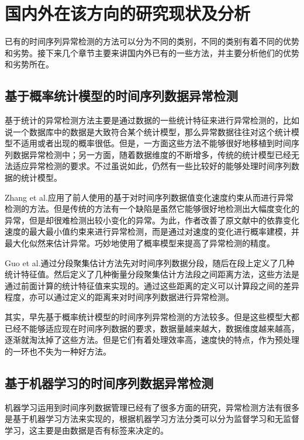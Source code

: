 \section{国内外在该方向的研究现状及分析}

已有的时间序列异常检测的方法可以分为不同的类别，不同的类别有着不同的优势和劣势。接下来几个章节主要来讲国内外已有的一些方法，并主要分析他们的优势和劣势所在。

\subsection{基于概率统计模型的时间序列数据异常检测}

基于统计的异常检测方法主要是通过数据的一些统计特征来进行异常检测的，比如说一个数据库中的数据是大致符合某个统计模型，那么异常数据往往对这个统计模型不适用或者出现的概率很低\cite{eskin2000anomaly,hido2011statistical}。但是，一方面这些方法不能够很好地移植到时间序列数据异常检测中；另一方面，随着数据维度的不断增多，传统的统计模型已经无法适应异常检测的要求。不过虽说如此，仍然有一些比较好的能够处理时间序列数据的统计模型。

Zhang et al.\cite{zhang2016sequential}应用了前人使用的基于对时间序列数据值变化速度约束从而进行异常检测的方法\cite{song2015screen}。但是传统的方法有一个缺陷是虽然它能够很好地检测出大幅度变化的异常，但是却很难检测出较小变化的异常。为此，作者改善了原文献中的依靠变化速度的最大最小值约束来进行异常检测，而是通过对速度的变化进行概率建模，并最大化似然来估计异常。巧妙地使用了概率模型来提高了异常检测的精度。

Guo et al.\cite{guo2010improved}通过分段聚集估计方法先对时间序列数据分段，随后在段上定义了几种统计特征值。然后定义了几种衡量分段聚集估计方法段之间距离方法，这些方法是通过前面计算的统计特征值来实现的。通过这些距离的定义可以计算段之间的差异程度，亦可以通过定义的距离来对时间序列数据进行异常检测。

其实，早先基于概率统计模型的时间序列异常检测的方法较多。但是这些模型大都已经不能够适应现在时间序列数据的要求，数据量越来越大，数据维度越来越高，逐渐就淘汰掉了这些方法。但是它们有着处理效率高，速度快的特点，作为预处理的一环也不失为一种好方法。

\subsection{基于机器学习的时间序列数据异常检测}

机器学习运用到时间序列数据管理已经有了很多方面的研究\cite{laure2018machine}，异常检测方法有很多是基于机器学习方法来实现的，根据机器学习方法分类可以分为监督学习和无监督学习，这主要是由数据是否有标签来决定的\cite{chandola2009anomaly}。

